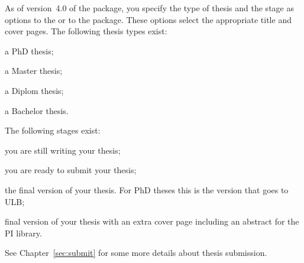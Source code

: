 As of version~4.0 of the package, you specify the type of thesis and the stage as options
to the  or to the  package.
These options select the appropriate title and cover pages.
The following thesis types exist:
\begin{description}\setlength{\parskip}{0pt}\setlength{\itemsep}{0pt}
\item[PhD] a PhD thesis;
\item[Master] a Master thesis;
\item[Diplom] a Diplom thesis;
\item[Bachelor] a Bachelor thesis.
\end{description}
The following stages exist:
\begin{description}\setlength{\parskip}{0pt}\setlength{\itemsep}{0pt}
\item[Draft] you are still writing your thesis;
\item[Submit] you are ready to submit your thesis;
\item[Final] the final version of your thesis.
  For PhD theses this is the version that goes to ULB;
\item[PILibrary] final version of your thesis with an extra cover page
  including an abstract for the PI library.
\end{description}
%
See Chapter~\ref{sec:submit} for some more details about thesis submission.

